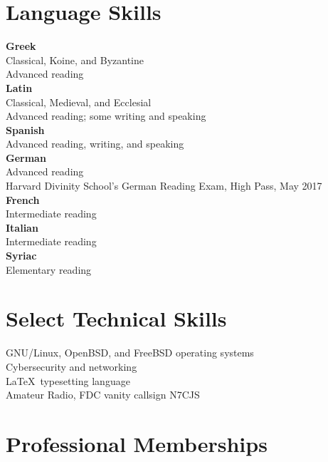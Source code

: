 \documentclass[letterpaper,12pt]{article}
\begin{document}
{{{{{{{%
\section*{Language Skills}

\textbf{Greek} \\ Classical, Koine, and Byzantine \\ Advanced reading \\ [.3cm]
%
\textbf{Latin} \\ Classical, Medieval, and Ecclesial \\ Advanced reading; some writing and speaking \\ [.3cm]
%
\textbf{Spanish} \\ Advanced reading, writing, and speaking \\ [.3cm]
%
\textbf{German} \\ Advanced reading \\
Harvard Divinity School's German Reading Exam, High Pass, May 2017 \\ [.3cm]
%
\textbf{French} \\ Intermediate reading \\ [.3cm]
%
\textbf{Italian} \\ Intermediate reading \\ [.3cm]
%
\textbf{Syriac} \\ Elementary reading

\section*{Select Technical Skills}

GNU/Linux, OpenBSD, and FreeBSD operating systems \\ [.3cm]
%
Cybersecurity and networking \\ [.3cm]
%
\LaTeX\ typesetting language \\ [.3cm]
%
Amateur Radio, FDC vanity callsign N7CJS

\section*{Professional Memberships}

}}}}}}}
\end{document}
